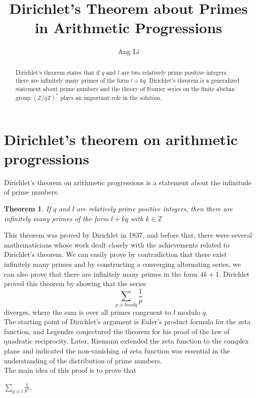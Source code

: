 \documentclass[psamsfonts]{amsart}
\title{Dirichlet's Theorem about Primes in Arithmetic Progressions}
\author{Ang Li}
\date{}
\newtheorem{thm}{Theorem}[section]
\theoremstyle{definition}
\theoremstyle{remark}
\numberwithin{equation}{section}
\begin{document}
	\begin{abstract}
		Dirichlet's theorem states that if $q$ and $l$ are two relatively prime positive integers, there are infinitely many primes of the form $l + kq$. Dirichlet's theorem is a generalized statement about prime numbers and the theory of Fourier series on the finite abelian group $(\mathbb{Z}/q\mathbb{Z})^*$ plays an important role in the solution.
	\end{abstract}
	
	\maketitle	
		
	\tableofcontents
	
	\section{Dirichlet's theorem on arithmetic progressions}
		Dirichlet's theorem on arithmetic progressions is a statement about the infinitude of prime numbers.
		\begin{thm}
			If $q$ and $l$ are relatively prime positive integers, then there are infinitely many primes of the form $l+kq$ with $k \in \mathbb{Z}$
		\end{thm}
		This theorem was proved by Dirichlet in 1837, and before that, there were several mathematicians whose work dealt closely with the achievements related to Dirichlet's theorem.
		We can easily prove by contradiction that there exist infinitely many primes and by constructing a converging alternating series, we can also prove that there are infinitely many primes in the form $4k +1$.
		Dirichlet proved this theorem by showing that the series
		\begin{equation}
			\sum_{p \equiv l mod q} \frac{1}{p}
		\end{equation}
		diverges, where the sum is over all primes congruent to $l$ modulo $q$.\\
		The starting point of Dirichlet's argument is Euler's product formula for the zeta function, and Legendre conjectured the theorem for his proof of the law of quadratic reciprocity. Later, Riemann extended the zeta function to the complex plane and indicated the non-vanishing of zeta function was essential in the understanding of the distribution of prime numbers.\\
		The main idea of this proof is to prove that 
		\begin{center}
			$\sum_{p \equiv l} \frac{1}{p^s}$,
		\end{center}
\end{document}
